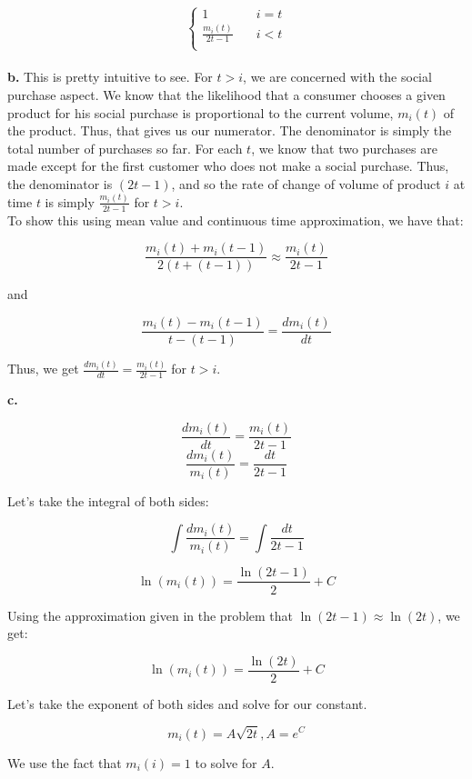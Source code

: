 \documentclass[12 pt]{article}
\begin{document}
	$$
	\left\{
	\begin{array}{ll}
	1 & \quad i = t \\
	\frac{m_i(t)}{2t-1} & \quad i < t\\
	\end{array}
	\right.
	$$	
	\\
	
	\noindent \textbf {b.} This is pretty intuitive to see. For $t > i$, we are concerned with the social purchase aspect. We know that the likelihood that a consumer chooses a given product for his social purchase is proportional to the current volume, $m_i(t)$ of the product. Thus, that gives us our numerator. The denominator is simply the total number of purchases so far. For each $t$, we know that two purchases are made except for the first customer who does not make a social purchase. Thus, the denominator is $(2t - 1)$, and so the rate of change of volume of product $i$ at time $t$ is simply $\frac{m_i(t)}{2t-1}$ for $t > i$. \\
	
	\noindent To show this using mean value and continuous time approximation, we have that:
	
	\[\frac{m_i(t) + m_i(t-1)}{2(t + (t-1))} \approx \frac{m_i(t)}{2t-1}\]
	
	\noindent and 
	
	\[\frac{m_i(t) - m_i(t-1)}{t - (t - 1)} = \frac {dm_i(t)}{dt}\]
	
	\noindent Thus, we get $\frac{dm_i(t)}{dt} = \frac{m_i(t)}{2t-1}$ for $t > i$.
	
	\noindent \textbf {c.}
	
	\[\frac{dm_i(t)}{dt} = \frac{m_i(t)}{2t-1}\]
	\[\frac{dm_i(t)}{m_i(t)} = \frac{dt}{2t-1}\]
	
	\noindent Let's take the integral of both sides:
	
	\[\int{\frac{dm_i(t)}{m_i(t)}} = \int{\frac{dt}{2t-1}}\]
	
	\[\ln (m_i(t)) = \frac{\ln(2t-1)}{2} + C\]
	
	\noindent Using the approximation given in the problem that $\ln(2t-1) \approx \ln(2t)$, we get:
	
	\[\ln (m_i(t)) = \frac{\ln(2t)}{2} + C\]
	
	\noindent Let's take the exponent of both sides and solve for our constant. 
	
	\[m_i(t) = A\sqrt{2t}, A = e^C\]
	
	\noindent We use the fact that $m_i(i) = 1$ to solve for $A$.
	
\end{document}
